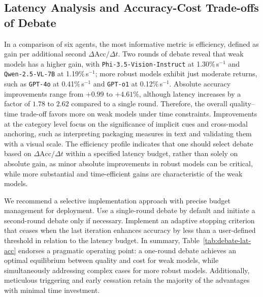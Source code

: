 \documentclass[11pt]{article}
\newcommand{\Qwenname}{Qwen-2.5-VL-7B}
\newcommand{\phiname}{Phi-3.5-Vision-Instruct}
\begin{document}

\subsection{Latency Analysis and Accuracy-Cost Trade-offs of Debate}
\label{sec:results-debate-latency}
In a comparison of six agents, the most informative metric is efficiency, defined as gain per additional second \(\Delta\mathrm{Acc}/\Delta t\). Two rounds of debate reveal that weak models has a higher gain, with \texttt{\phiname} at 1.30\%\,s\(^{-1}\) and \texttt{\Qwenname} at 1.19\%\,s\(^{-1}\); more robust models exhibit just moderate returns, such as \texttt{GPT-4o} at 0.41\%\,s\(^{-1}\) and \texttt{GPT-o1} at 0.12\%\,s\(^{-1}\). Absolute accuracy improvements range from \(+0.99\) to \(+4.61\)\%, although latency increases by a factor of \(1.78\) to \(2.62\) compared to a single round. Therefore, the overall quality–time trade-off favors more on weak models under time constraints. Improvements at the category level focus on the significance of implicit cues and cross-modal anchoring, such as interpreting packaging measures in text and validating them with a visual scale. The efficiency profile indicates that one should select debate based on \(\Delta\mathrm{Acc}/\Delta t\) within a specified latency budget, rather than solely on absolute gain, as minor absolute improvements in robust models can be critical, while more substantial and time-efficient gains are characteristic of the weak models.

 We recommend a selective implementation approach with precise budget management for deployment.  Use a single-round debate by default and initiate a second-round debate only if necessary.  Implement an adaptive stopping criterion that ceases when the last iteration enhances accuracy by less than a user-defined threshold in relation to the latency budget.  In summary, Table~\ref{tab:debate-lat-acc} endorses a pragmatic operating point: a one-round debate achieves an optimal equilibrium between quality and cost for weak models, while simultaneously addressing complex cases for more robust models. Additionally, meticulous triggering and early cessation retain the majority of the advantages with minimal time investment.
\end{document}
